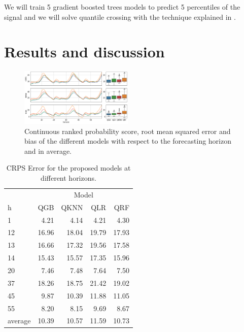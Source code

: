 \documentclass[a4paper,twocolumn,5p]{elsarticle}
\begin{document}
We will train 5 gradient boosted trees models to predict 5 percentiles
of the \no signal and we will solve quantile 
crossing with the technique
explained in \cite{cross}.

\section{Results and discussion}
\label{sec:results}

\begin{figure}[tbp]
  \centering
  \includegraphics[width=0.48\textwidth]{error_graph}
  \caption{\label{figure:errorGraph}
    Continuous ranked probability score, root mean squared
    error and bias of the different models with respect to the
    forecasting horizon and in average.
  }
\end{figure}

\begin{table}[tbp]
  \centering
  \caption{\label{tab:determ}CRPS Error for the proposed models at different
    horizons.}
  \begin{tabular}{lrrrr}
    \toprule
    & \multicolumn{4}{c}{Model} \\ \cmidrule{2-5} 
    h &    QGB &  QKNN &   QLR &   QRF \\
    \midrule
    1     &  4.21 &   4.14 &  4.21 &  4.30 \\
12    & 16.96 &  18.04 & 19.79 & 17.93 \\
13    & 16.66 &  17.32 & 19.56 & 17.58 \\
14    & 15.43 &  15.57 & 17.35 & 15.96 \\
20    &  7.46 &   7.48 &  7.64 &  7.50 \\
37    & 18.26 &  18.75 & 21.42 & 19.02 \\
45    &  9.87 &  10.39 & 11.88 & 11.05 \\
55    &  8.20 &   8.15 &  9.69 &  8.67 \\

    \midrule
    average & 10.39 &  10.57 & 11.59 & 10.73 \\
    \bottomrule
  \end{tabular}
\end{table}
\end{document}
